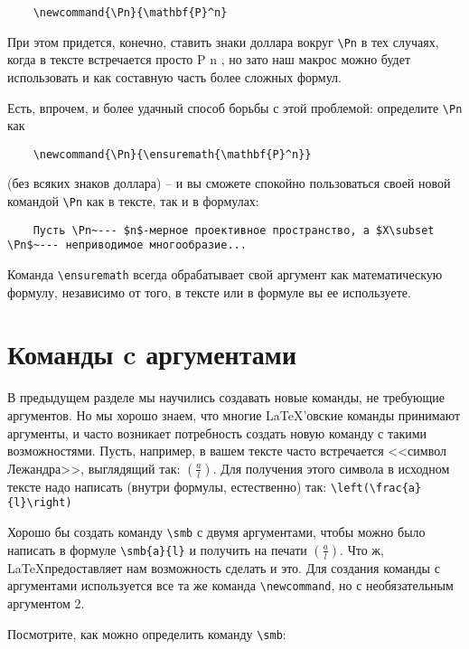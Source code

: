 \begin{verbatim}
	\newcommand{\Pn}{\mathbf{P}^n}
\end{verbatim}

При этом придется, конечно, ставить знаки доллара вокруг \verb"\Pn" в тех случаях, когда в тексте встречается просто P n , но зато наш макрос можно будет использовать и как составную часть более сложных формул.

Есть, впрочем, и более удачный способ борьбы с этой проблемой: определите \verb"\Pn" как

\begin{verbatim}
	\newcommand{\Pn}{\ensuremath{\mathbf{P}^n}}
\end{verbatim}

(без всяких знаков доллара) -- и вы сможете спокойно пользоваться своей новой командой \verb"\Pn" как в тексте, так и в формулах:

\begin{verbatim}
	Пусть \Pn~--- $n$-мерное проективное пространство, а $X\subset \Pn$~--- неприводимое многообразие...
\end{verbatim}

Команда \verb"\ensuremath" всегда обрабатывает свой аргумент как математическую формулу, независимо от того, в тексте или в формуле вы ее используете.

\section{Команды c аргументами}

В предыдущем разделе мы научились создавать новые команды, не требующие аргументов. Но мы хорошо знаем, что многие \LaTeX ’овские команды принимают аргументы, и часто возникает потребность создать новую команду с такими возможностями. Пусть, например, в вашем тексте часто встречается <<символ Лежандра>>, выглядящий так: $\left(\frac{a}{l}\right)$. Для получения этого символа в исходном тексте надо написать (внутри формулы, естественно) так: \verb"\left(\frac{a}{l}\right)"

Хорошо бы создать команду \verb"\smb" с двумя аргументами, чтобы можно было написать в формуле \verb"\smb{a}{l}" и получить на печати $\left(\frac{a}{l}\right)$. Что ж, \LaTeX предоставляет нам возможность сделать и это. Для создания команды с аргументами используется все та же команда \verb"\newcommand", но с необязательным аргументом 2.

Посмотрите, как можно определить команду \verb"\smb":


